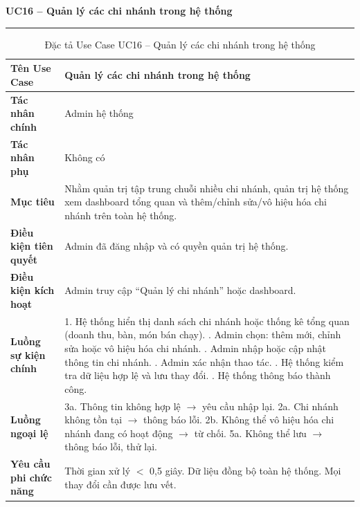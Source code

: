 ﻿\documentclass[../DoAn.tex]{subfiles}
\newcommand{\UCtitle}[1]{%
    \vspace{0.5em}
    {\large\bfseries #1}\\[-0.5em]
    \rule{\textwidth}{0.5pt}
    \vspace{0.3em}
}
\begin{document}
\begin{table}[H]
\UCtitle{UC16 – Quản lý các chi nhánh trong hệ thống}
\centering
\begin{tabular}{|p{4cm}|p{10.2cm}|}
\hline
\textbf{Tên Use Case} & Quản lý các chi nhánh trong hệ thống \\ \hline
\textbf{Tác nhân chính} & Admin hệ thống \\ \hline
\textbf{Tác nhân phụ} & Không có \\ \hline
\textbf{Mục tiêu} &
Nhằm quản trị tập trung chuỗi nhiều chi nhánh, quản trị hệ thống xem dashboard tổng quan và thêm/chỉnh sửa/vô hiệu hóa chi nhánh trên toàn hệ thống.
\\ \hline
\textbf{Điều kiện tiên quyết} & Admin đã đăng nhập và có quyền quản trị hệ thống. \\ \hline
\textbf{Điều kiện kích hoạt} & Admin truy cập ``Quản lý chi nhánh'' hoặc dashboard. \\ \hline
\textbf{Luồng sự kiện chính} &
1. Hệ thống hiển thị danh sách chi nhánh hoặc thống kê tổng quan (doanh thu, bàn, món bán chạy). \newline
2. Admin chọn: thêm mới, chỉnh sửa hoặc vô hiệu hóa chi nhánh. \newline
3. Admin nhập hoặc cập nhật thông tin chi nhánh. \newline
4. Admin xác nhận thao tác. \newline
5. Hệ thống kiểm tra dữ liệu hợp lệ và lưu thay đổi. \newline
6. Hệ thống thông báo thành công.
\\ \hline
\textbf{Luồng ngoại lệ} &
3a. Thông tin không hợp lệ $\rightarrow$ yêu cầu nhập lại. \newline
2a. Chi nhánh không tồn tại $\rightarrow$ thông báo lỗi. \newline
2b. Không thể vô hiệu hóa chi nhánh đang có hoạt động $\rightarrow$ từ chối. \newline
5a. Không thể lưu $\rightarrow$ thông báo lỗi, thử lại.
\\ \hline
\textbf{Yêu cầu phi chức năng} &
Thời gian xử lý $<$ 0,5 giây. Dữ liệu đồng bộ toàn hệ thống. Mọi thay đổi cần được lưu vết.
\\ \hline
\end{tabular}
\caption{Đặc tả Use Case UC16 – Quản lý các chi nhánh trong hệ thống}
\end{table}
\end{document}
